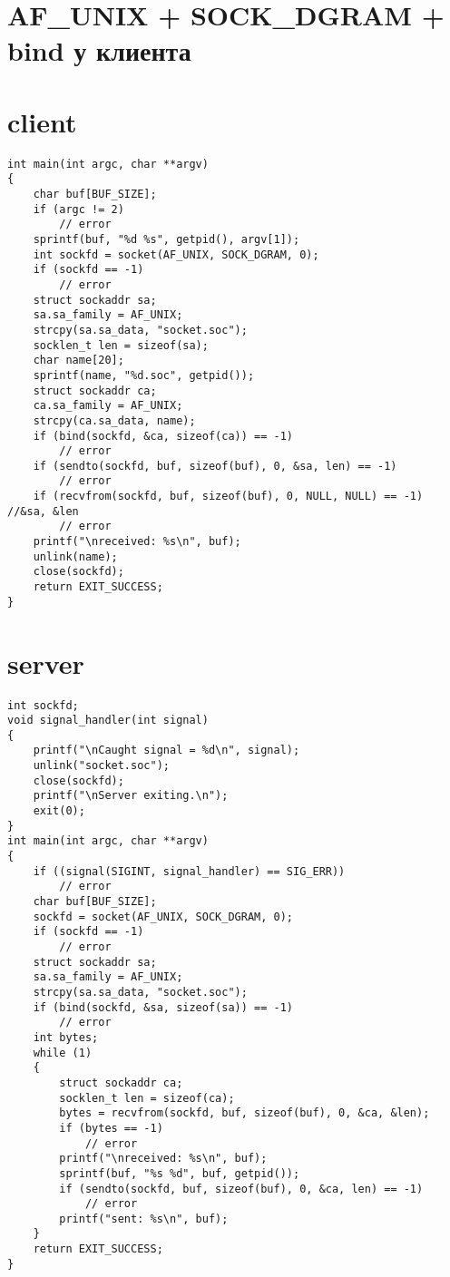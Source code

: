 \section{AF\_UNIX + SOCK\_DGRAM + bind у клиента}

\section*{client}

\begin{lstlisting}
int main(int argc, char **argv)
{
    char buf[BUF_SIZE];
    if (argc != 2)
        // error
    sprintf(buf, "%d %s", getpid(), argv[1]);
    int sockfd = socket(AF_UNIX, SOCK_DGRAM, 0);
    if (sockfd == -1)
        // error
    struct sockaddr sa;
    sa.sa_family = AF_UNIX;
    strcpy(sa.sa_data, "socket.soc");
    socklen_t len = sizeof(sa);
    char name[20];
    sprintf(name, "%d.soc", getpid());
    struct sockaddr ca;
    ca.sa_family = AF_UNIX;
    strcpy(ca.sa_data, name);
    if (bind(sockfd, &ca, sizeof(ca)) == -1) 
        // error
    if (sendto(sockfd, buf, sizeof(buf), 0, &sa, len) == -1)
        // error
    if (recvfrom(sockfd, buf, sizeof(buf), 0, NULL, NULL) == -1) //&sa, &len
        // error
    printf("\nreceived: %s\n", buf);
    unlink(name);
    close(sockfd);
    return EXIT_SUCCESS;
}
\end{lstlisting}

\section*{server}

\begin{lstlisting}
int sockfd;
void signal_handler(int signal)
{
    printf("\nCaught signal = %d\n", signal);
    unlink("socket.soc");
    close(sockfd);
    printf("\nServer exiting.\n");
    exit(0);
}
int main(int argc, char **argv)
{
    if ((signal(SIGINT, signal_handler) == SIG_ERR)) 
        // error
    char buf[BUF_SIZE];
    sockfd = socket(AF_UNIX, SOCK_DGRAM, 0);
    if (sockfd == -1)
        // error
    struct sockaddr sa;
    sa.sa_family = AF_UNIX;
    strcpy(sa.sa_data, "socket.soc");
    if (bind(sockfd, &sa, sizeof(sa)) == -1) 
        // error
    int bytes;
    while (1) 
    {
        struct sockaddr ca;
        socklen_t len = sizeof(ca);
        bytes = recvfrom(sockfd, buf, sizeof(buf), 0, &ca, &len);
        if (bytes == -1) 
            // error
        printf("\nreceived: %s\n", buf);
        sprintf(buf, "%s %d", buf, getpid());
        if (sendto(sockfd, buf, sizeof(buf), 0, &ca, len) == -1)
            // error
        printf("sent: %s\n", buf);
    }
    return EXIT_SUCCESS;
}
\end{lstlisting}

